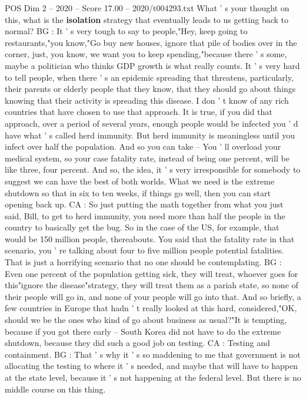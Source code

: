 \begin{textsample}{POS Dim 2 – 2020 – Score 17.00 – 2020/t004293.txt}
What ' s your thought on this, what is the \textbf{isolation} strategy that eventually leads to us getting back to normal?
BG : It ' s very tough to say to people,"Hey, keep going to restaurants,"you know,"Go buy new houses, ignore that pile of bodies over in the corner, just, you know, we want you to keep spending,"because there ' s some, maybe a politician who thinks GDP growth is what really counts.
It ' s very hard to tell people, when there ' s an epidemic spreading that threatens, particularly, their parents or elderly people that they know, that they should go about things knowing that their activity is spreading this disease.
I don ' t know of any rich countries that have chosen to use that approach.
It is true, if you did that approach, over a period of several years, enough people would be infected you ' d have what ' s called herd immunity.
But herd immunity is meaningless until you infect over half the population.
And so you can take -- You ' ll overload your medical system, so your case fatality rate, instead of being one percent, will be like three, four percent.
And so, the idea, it ' s very irresponsible for somebody to suggest we can have the best of both worlds.
What we need is the extreme shutdown so that in six to ten weeks, if things go well, then you can start opening back up.
CA : So just putting the math together from what you just said, Bill, to get to herd immunity, you need more than half the people in the country to basically get the bug.
So in the case of the US, for example, that would be 150 million people, thereabouts.
You said that the fatality rate in that scenario, you ' re talking about four to five million people potential fatalities.
That is just a horrifying scenario that no one should be contemplating.
BG : Even one percent of the population getting sick, they will treat, whoever goes for this"ignore the disease"strategy, they will treat them as a pariah state, so none of their people will go in, and none of your people will go into that.
And so briefly, a few countries in Europe that hadn ' t really looked at this hard, considered,"OK, should we be the ones who kind of go about business as usual?"It is tempting, because if you got there early -- South Korea did not have to do the extreme shutdown, because they did such a good job on testing.
CA : Testing and containment.
BG : That ' s why it ' s so maddening to me that government is not allocating the testing to where it ' s needed, and maybe that will have to happen at the state level, because it ' s not happening at the federal level.
But there is no middle course on this thing.

\end{textsample}
